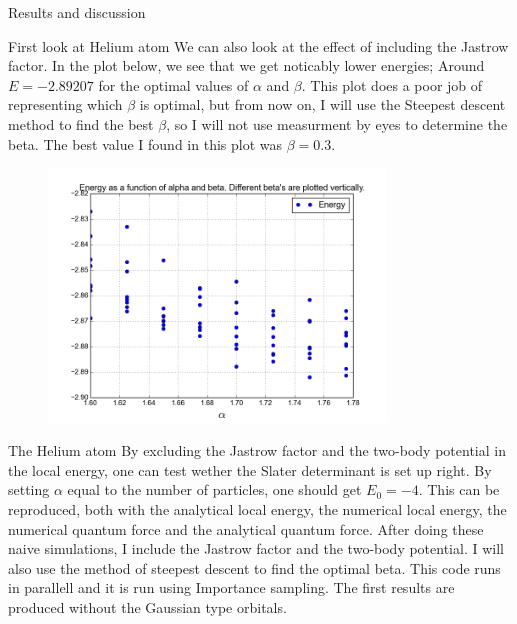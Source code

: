 \documentclass[a4paper, 12pt, titlepage]{article}
\begin{document}
\begin{section}{Results and discussion}
\begin{subsection}{First look at Helium atom}
 We can also look at the effect of including the Jastrow factor. In the plot below, we see that we get noticably lower energies; Around $E = -2.89207$ for the optimal values of $\alpha$ and $\beta$. This plot does a poor job of representing which $\beta$ is optimal, but from now on, I will use the Steepest descent method to find the best $\beta$, so I will not use measurment by eyes to determine the beta. The best value I found in this plot was $\beta = 0.3$. 
 \begin{figure}[H]
 	\centering
 	\includegraphics[width=0.8\textwidth]{../python_programs/EnergyVariance_helium5.png}
 	\label{Helium3}
 \end{figure}

 \end{subsection}
 \begin{subsection}{The Helium atom}
 	By excluding the Jastrow factor and the two-body potential in the local energy, one can test wether the Slater determinant is set up right. By setting $\alpha$ equal to the number of particles, one should get $E_0 = -4$. This can be reproduced, both with the analytical local energy, the numerical local energy, the numerical quantum force and the analytical quantum force. After doing these naive simulations, I include the Jastrow factor and the two-body potential. I will also use the method of steepest descent to find the optimal beta. This code runs in parallell and it is run using Importance sampling. The first results are produced without the Gaussian type orbitals. 


\end{subsection}
\end{section}
\end{document}

